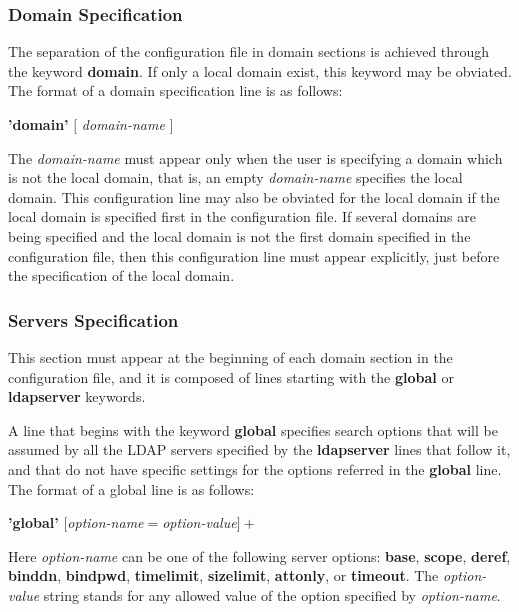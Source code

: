 \subsubsection{Domain Specification}

The separation of the configuration file in domain sections is achieved
through the keyword {\bf domain}. If only a local domain exist, this
keyword may be obviated. The format of a domain specification line is
as follows:

\begin{center}
{\bf 'domain'} $[$ {\em domain-name} $]$
\end{center}

The {\em domain-name} must appear only when the user is specifying a
domain which is not the local domain, that is, an empty {\em
domain-name} specifies the local domain. This configuration line may
also be obviated for the local domain if the local domain is specified
first in the configuration file. If several domains are being
specified and the local domain is not the first domain specified in
the configuration file, then this configuration line must appear
explicitly, just before the specification of the local domain.

\subsubsection{Servers Specification}

This section must appear at the beginning of each domain section in
the configuration file, and it is composed of lines starting with the 
{\bf global} or {\bf ldapserver} keywords.

A line that begins with the keyword {\bf global} specifies search options
that will be assumed by all the LDAP servers specified by the {\bf
ldapserver} lines that follow it, and that do not have specific
settings for the options referred in the {\bf global} line.
The format of a global line is as follows:
	
\begin{center}
{\bf 'global'} $[${\em option-name}{\bf $=$}{\em option-value}$]+$
\end{center}		

Here {\em option-name} can be one of the following server options:
{\bf base}, {\bf scope}, {\bf deref}, {\bf binddn}, {\bf bindpwd},
{\bf timelimit}, {\bf sizelimit}, {\bf attonly}, or {\bf timeout}. 
The {\em option-value} string stands for any allowed value of the
option specified by {\em option-name}.

